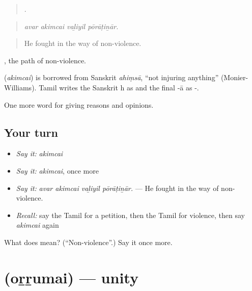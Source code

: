 \begin{quote}
   .
\end{quote}

\begin{quote}
\emph{avar akimcai vaḻiyil pōrāṭiṉār.}
\end{quote}

\begin{quote}
He fought in the way of non-violence.
\end{quote}

 , the path of non-violence.

\begin{cousinweb}
\textbf{} (\emph{akimcai}) is borrowed from Sanskrit \emph{ahiṃsā}, \textquotedblleft{}not injuring anything\textquotedblright{} (Monier-Williams). Tamil writes the Sanskrit h as  and the final -ā as -.
\end{cousinweb}

\begin{grammarlens}[title={What you've built}]
One more word for giving reasons and opinions.
\end{grammarlens}

\subsection*{Your turn}
\begin{itemize}
\raggedright
  \item \emph{Say it:} \emph{akimcai}
  \item \emph{Say it:} \emph{akimcai}, once more
  \item \emph{Say it:} \emph{avar akimcai vaḻiyil pōrāṭiṉār.} — He fought in the way of non-violence.
  \item \emph{Recall:} say the Tamil for a petition, then the Tamil for violence, then say \emph{akimcai} again
\end{itemize}

\begin{tcolorbox}[breakable,colback=teal!4,colframe=teal!35!black,title={Before you move on}]
What does  mean? (\textquotedblleft{}Non-violence\textquotedblright{}.) Say it once more.
\end{tcolorbox}
\section[\texorpdfstring{\ta{ஒற்றுமை} (oṟṟumai)}{ஒற்றுமை (oṟṟumai)}]{ (oṟṟumai) — unity}

